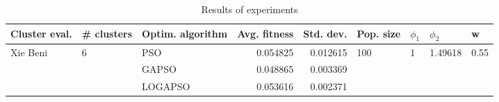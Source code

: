 \begin{table}
\centering
\caption{Results of experiments}
\begin{tabular}{lllrrllll}
\toprule
            Cluster eval. &        \# clusters & Optim. algorithm &  Avg. fitness &  Std. dev. &            Pop. size &         $\phi_{1}$ &               $\phi_{2}$ &                     w \\
\midrule
\multirow{3}{*}{Xie Beni} & \multirow{3}{*}{6} &              PSO &      0.054825 &   0.012615 & \multirow{3}{*}{100} & \multirow{3}{*}{1} & \multirow{3}{*}{1.49618} & \multirow{3}{*}{0.55} \\
                          &                    &            GAPSO &      0.048865 &   0.003369 &                      &                    &                          &                       \\
                          &                    &          LOGAPSO &      0.053616 &   0.002371 &                      &                    &                          &                       \\
\bottomrule
\end{tabular}
\end{table}
